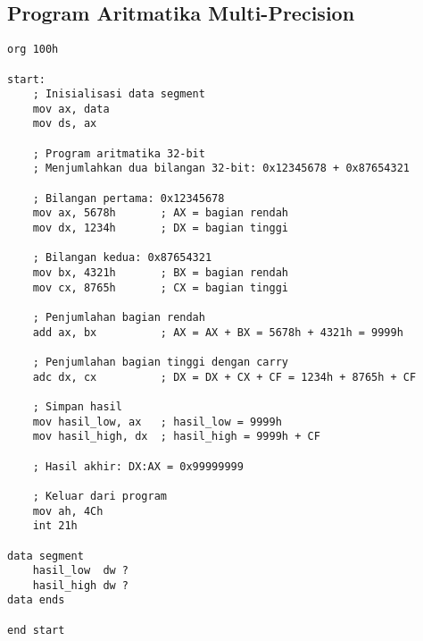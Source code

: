 \documentclass[../main.tex]{subfiles}
\begin{document}
        \subsection{Program Aritmatika Multi-Precision}
            \begin{lstlisting}[language={[x86masm]Assembler}, caption=Program Aritmatika Multi-Precision, label={lst:multiprecision-program}]
org 100h

start:
    ; Inisialisasi data segment
    mov ax, data
    mov ds, ax
    
    ; Program aritmatika 32-bit
    ; Menjumlahkan dua bilangan 32-bit: 0x12345678 + 0x87654321
    
    ; Bilangan pertama: 0x12345678
    mov ax, 5678h       ; AX = bagian rendah
    mov dx, 1234h       ; DX = bagian tinggi
    
    ; Bilangan kedua: 0x87654321
    mov bx, 4321h       ; BX = bagian rendah
    mov cx, 8765h       ; CX = bagian tinggi
    
    ; Penjumlahan bagian rendah
    add ax, bx          ; AX = AX + BX = 5678h + 4321h = 9999h
    
    ; Penjumlahan bagian tinggi dengan carry
    adc dx, cx          ; DX = DX + CX + CF = 1234h + 8765h + CF
    
    ; Simpan hasil
    mov hasil_low, ax   ; hasil_low = 9999h
    mov hasil_high, dx  ; hasil_high = 9999h + CF
    
    ; Hasil akhir: DX:AX = 0x99999999
    
    ; Keluar dari program
    mov ah, 4Ch
    int 21h

data segment
    hasil_low  dw ?
    hasil_high dw ?
data ends

end start
            \end{lstlisting}
\end{document}

